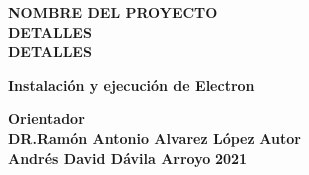 \begin{titlepage}

\begin{center}
    \large
    {\bf NOMBRE DEL PROYECTO} \\ 
    {\bf DETALLES} \\
    {\bf DETALLES} \\
    
    \par
    \vspace{215pt}
        {\Large \bf Instalación y ejecución de Electron}
    \vspace{7pt}
    
    \par
    \vfill
        {\large  \bf Orientador} \\
        {\large  \bf DR.Ramón Antonio Alvarez López} 
    \vfill
        {\large  \bf Autor} \\
        {\large  \bf Andrés David Dávila Arroyo} 
    \vfill
        \textbf{%
        {\large 2021}}
    \end{center}
\end{titlepage}
